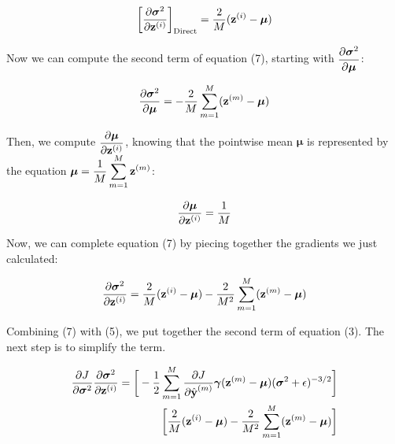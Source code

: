 \documentclass{article}
\begin{document}
\begin{multicols*}{2}
\begin{equation}
    \bigg[{\partial \boldsymbol{\sigma}^2 \over \partial \textbf{z}^{(i)}} \bigg]_{\text{Direct}} =
    {2 \over M} (\textbf{z}^{(i)} - \boldsymbol{\mu}) \notag
\end{equation}

Now we can compute the second term of equation (7), starting with 
$\begin{aligned}
    {\partial \boldsymbol{\sigma}^2 \over \partial \boldsymbol{\mu}}
\end{aligned}$:

\begin{equation}
    {\partial \boldsymbol{\sigma}^2 \over \partial \boldsymbol{\mu}} = 
    -{2 \over M} \sum_{m=1}^M (\textbf{z}^{(m)} - \boldsymbol{\mu}) \notag
\end{equation}

Then, we compute $\begin{aligned}
    {\partial \boldsymbol{\mu} \over \partial \textbf{z}^{(i)}}
\end{aligned}$, knowing that the pointwise mean $\boldsymbol{\mu}$ is represented by the equation $\begin{aligned}
    \boldsymbol{\mu} = {1\over M} \sum_{m=1}^M\textbf{z}^{(m)}
\end{aligned}$:

\begin{equation}
    {\partial \boldsymbol{\mu} \over \partial \textbf{z}^{(i)}} = 
    {1\over M} 
\end{equation}

Now, we can complete equation (7) by piecing together the gradients 
we just calculated:

\begin{equation}
    {\partial \boldsymbol{\sigma}^2 \over \partial \textbf{z}^{(i)}} = 
    {2 \over M} (\textbf{z}^{(i)} - \boldsymbol{\mu})
    -{2 \over M^2} \sum_{m=1}^M (\textbf{z}^{(m)} - \boldsymbol{\mu}) \notag
\end{equation}

Combining (7) with (5), we put together the second term of equation (3).
The next step is to simplify the term.

$$
\begin{aligned}
    {\partial J \over \partial \boldsymbol{\sigma}^2} 
    {\partial \boldsymbol{\sigma}^2 \over \partial \textbf{z}^{(i)}} = 
    \bigg[
    -{1\over 2}
    \sum_{m = 1}^M {\partial J \over \partial \hat{\textbf{y}}^{(m)}} 
    \boldsymbol{\gamma}
    (\textbf{z}^{(m)} - \boldsymbol{\mu}) (\boldsymbol{\sigma}^2 + \epsilon)^{-3/2} \bigg]\\
    \bigg[{2 \over M} (\textbf{z}^{(i)} - \boldsymbol{\mu})
    -{2 \over M^2} \sum_{m=1}^M (\textbf{z}^{(m)} - \boldsymbol{\mu})\bigg]
\end{aligned}
$$
    

\end{multicols*}
\end{document}
